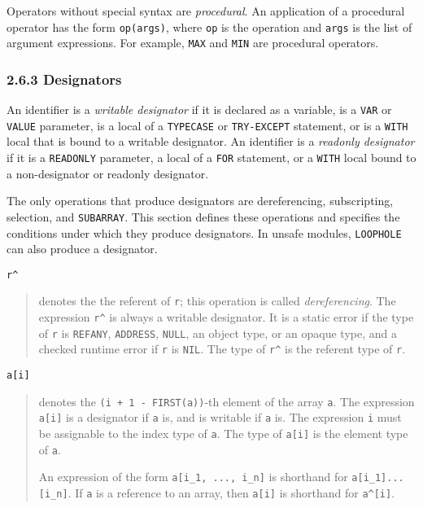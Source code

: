 \documentclass[10pt]{article}
\begin{document}
Operators without special syntax are \emph{procedural}.  An application of a
procedural operator has the form \verb|op(args)|, where \verb|op| is the
operation and \verb|args| is the list of argument expressions.  For example,
\verb|MAX| and \verb|MIN| are procedural operators.

\subsubsection*{2.6.3 Designators}

An identifier is a \emph{writable designator} if it is declared as a variable,
is a \verb|VAR| or \verb|VALUE| parameter, is a local of a \verb|TYPECASE| or
\verb|TRY-EXCEPT| statement, or is a \verb|WITH| local that is bound to a
writable designator.  An identifier is a \emph{readonly designator} if it is a
\verb|READONLY| parameter, a local of a \verb|FOR| statement, or a \verb|WITH|
local bound to a non-designator or readonly designator.

The only operations that produce designators are dereferencing, subscripting,
selection, and \verb|SUBARRAY|.  This section defines these operations and
specifies the conditions under which they produce designators.  In unsafe
modules, \verb|LOOPHOLE| can also produce a designator.

\verb|r^|
\begin{quote}
  denotes the the referent of \verb|r|; this operation is called
  \emph{dereferencing}.  The expression \verb|r^| is always a writable
  designator.  It is a static error if the type of \verb|r| is \verb|REFANY|,
  \verb|ADDRESS|, \verb|NULL|, an object type, or an opaque type, and a
  checked runtime error if \verb|r| is \verb|NIL|.  The type of \verb|r^| is
  the referent type of \verb|r|.
\end{quote}

\verb|a[i]|
\begin{quote}
  denotes the \verb|(i + 1 - FIRST(a))|-th element of the array \verb|a|.  The
  expression \verb|a[i]| is a designator if \verb|a| is, and is writable if
  \verb|a| is.  The expression \verb|i| must be assignable to the index type
  of \verb|a|.  The type of \verb|a[i]| is the element type of \verb|a|.

  An expression of the form \verb|a[i_1, ..., i_n]| is shorthand for
  \verb|a[i_1]...[i_n]|.  If \verb|a| is a reference to an array, then
  \verb|a[i]| is shorthand for \verb|a^[i]|.
\end{quote}
\end{document}
